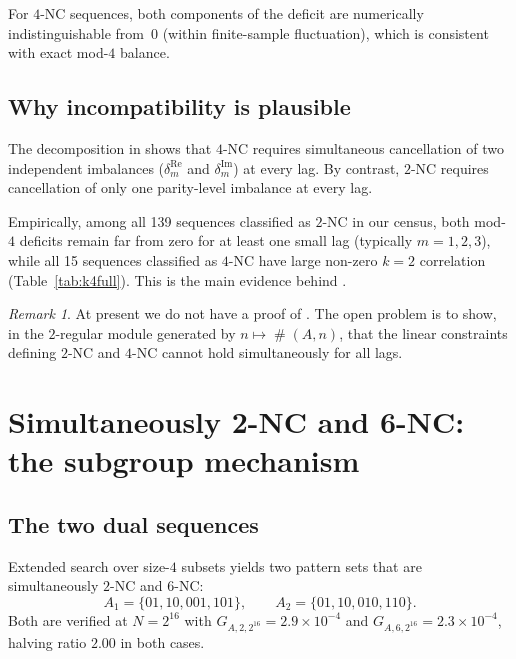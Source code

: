 \documentclass[11pt]{article}
\theoremstyle{definition}
\theoremstyle{remark}
\newtheorem{remark}[theorem]{Remark}
\DeclareMathOperator{\occ}{\#}
\begin{document}
For $4$-NC sequences, both components of the deficit are numerically
indistinguishable from~$0$ (within finite-sample fluctuation), which is
consistent with exact mod-$4$ balance.

\subsection{Why incompatibility is plausible}

The decomposition in  shows that $4$-NC requires
simultaneous cancellation of two independent imbalances
($\delta_m^{\mathrm{Re}}$ and $\delta_m^{\mathrm{Im}}$) at every lag.
By contrast, $2$-NC requires cancellation of only one parity-level
imbalance at every lag.

Empirically, among all 139 sequences classified as $2$-NC in our
census, both mod-$4$ deficits remain far from zero for at least one
small lag (typically $m=1,2,3$), while all 15 sequences classified as
$4$-NC have large non-zero $k=2$ correlation (Table~\ref{tab:k4full}).
This is the main evidence behind .

\begin{remark}
At present we do not have a proof of .  The open
problem is to show, in the $2$-regular module generated by
$n\mapsto \occ(A,n)$, that the linear constraints defining $2$-NC and
$4$-NC cannot hold simultaneously for all lags.
\end{remark}

\section{Simultaneously 2-NC and 6-NC: the subgroup mechanism}
\label{sec:26nc}

\subsection{The two dual sequences}

Extended search over size-$4$ subsets yields two pattern sets that
are simultaneously $2$-NC and $6$-NC:
\[
  A_1 = \{01, 10, 001, 101\},
  \qquad
  A_2 = \{01, 10, 010, 110\}.
\]
Both are verified at $N = 2^{16}$ with $G_{A,2,2^{16}} = 2.9 \times 10^{-4}$
and $G_{A,6,2^{16}} = 2.3 \times 10^{-4}$, halving ratio $2.00$ in both cases.
\end{document}
